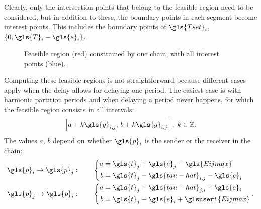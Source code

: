 \documentclass[main.tex]{subfiles}
\begin{document}
Clearly, only the intersection points that belong to the feasible region need to be considered, but in addition to these, the boundary points in each segment become interest points.
This includes the boundary points of $\gls{Tset}_i$, $\braces{0,\gls{T}_i-\gls{e}_i}$.

\begin{figure}[htbp]
    \centering
    \resizebox{0.9\linewidth}{!}{}
    \caption{Feasible region (red) constrained by one chain, with all interest points (blue).}
    \label{fig:utility-chains}
\end{figure}

Computing these feasible regions is not straightforward because different cases apply when the delay allows for delaying one period.
The easiest case is with harmonic partition periods and when delaying a period never happens, for which the feasible region consists in all intervals:
\begin{align}
    \left[ a+k\gls{g}_{i,j},\,b+k\gls{g}_{i,j} \right],\;k\in\mathbb{Z}.
    \label{eq:feasible-region}
\end{align}
The values $a$, $b$ depend on whether $\gls{p}_i$ is the sender or the receiver in the chain:
\begin{align}
    \gls{p}_i\rightarrow\gls{p}_j&:\qquad\left\{
    \begin{aligned}
        a &= \gls{t}_j+\gls{e}_j-\gls{Eijmax} \\
        b &= \gls{t}_j-\gls{tau-hat}_{i,j}-\gls{e}_i
    \end{aligned}\right. \\
    \gls{p}_j\rightarrow\gls{p}_i&:\qquad\left\{
    \begin{aligned}
        a &= \gls{t}_j+\gls{tau-hat}_{j,i}+\gls{e}_i \\
        b &= \gls{t}_j-\gls{e}_i+\glsuseri{Eijmax}
    \end{aligned}\right. .
\end{align}
\end{document}
